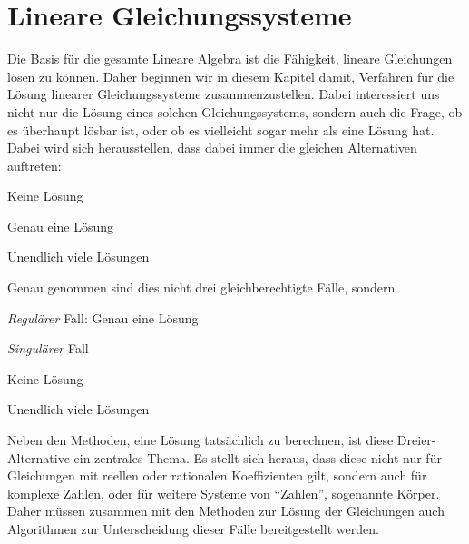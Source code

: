%
%
%
\chapter{Lineare Gleichungssysteme\label{chapter-lingl}}
Die Basis für die gesamte Lineare Algebra ist die Fähigkeit, lineare
Gleichungen lösen zu können.
Daher beginnen wir in diesem Kapitel
damit, Verfahren für die Lösung linearer Gleichungssysteme
zusammenzustellen.
Dabei interessiert uns nicht nur die Lösung
eines solchen Gleichungssystems, sondern auch die Frage, ob es
überhaupt lösbar ist, oder ob es vielleicht sogar mehr als eine
Lösung hat.
Dabei wird sich herausstellen, dass dabei immer die
gleichen Alternativen auftreten:
\begin{compactenum}
\item Keine Lösung
\item Genau eine Lösung
\item Unendlich viele Lösungen
\end{compactenum}
Genau genommen sind dies nicht drei gleichberechtigte Fälle,
sondern
\begin{compactenum}
\item {\em Regulärer} Fall: Genau eine Lösung
\item {\em Singulärer} Fall
\begin{compactenum}
\item Keine Lösung
\item Unendlich viele Lösungen
\end{compactenum}
\end{compactenum}
Neben den Methoden, eine Lösung tatsächlich zu berechnen, ist
diese Dreier-Alternative ein zentrales Thema.
Es stellt sich heraus,
dass diese nicht nur für Gleichungen mit reellen oder rationalen
Koeffizienten gilt, sondern auch für komplexe Zahlen, oder
für weitere Systeme von ``Zahlen'', sogenannte Körper.
Daher
müssen zusammen mit den Methoden zur Lösung der Gleichungen
auch Algorithmen zur Unterscheidung dieser Fälle bereitgestellt
werden.









